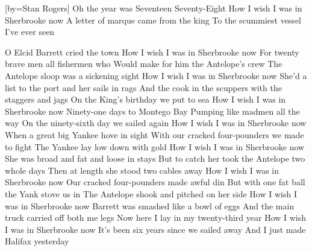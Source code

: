 [by={Stan Rogers}]
\beginverse\singlespacing
Oh the year was Seventeen Seventy-Eight
How I wish I was in Sherbrooke now
A letter of marque came from the king
To the scummiest vessel I've ever seen
\endverse


\beginverse\singlespacing
O Elcid Barrett cried the town
How I wish I was in Sherbrooke now
For twenty brave men all fishermen who
Would make for him the Antelope's crew
\endverse
{}
\beginverse\singlespacing
The Antelope sloop was a sickening sight
How I wish I was in Sherbrooke now
She'd a list to the port and her sails in rags
And the cook in the scuppers with the staggers and jags
\endverse
{}
\beginverse\singlespacing
On the King's birthday we put to sea
How I wish I was in Sherbrooke now
Ninety-one days to Montego Bay
Pumping like madmen all the way
\endverse
{}
\beginverse\singlespacing
On the ninety-sixth day we sailed again
How I wish I was in Sherbrooke now
When a great big Yankee hove in sight
With our cracked four-pounders we made to fight
\endverse
{}
\beginverse\singlespacing
The Yankee lay low down with gold
How I wish I was in Sherbrooke now
She was broad and fat and loose in stays
But to catch her took the Antelope two whole days
\endverse
{}
\beginverse\singlespacing
Then at length she stood two cables away
How I wish I was in Sherbrooke now
Our cracked four-pounders made awful din
But with one fat ball the Yank stove us in
\endverse
{}
\beginverse\singlespacing
The Antelope shook and pitched on her side
How I wish I was in Sherbrooke now
Barrett was smashed like a bowl of eggs
And the main truck carried off both me legs
\endverse
{}
\beginverse\singlespacing
Now here I lay in my twenty-third year
How I wish I was in Sherbrooke now
It's been six years since we sailed away
And I just made Halifax yesterday
\endverse
{}

\endsong

